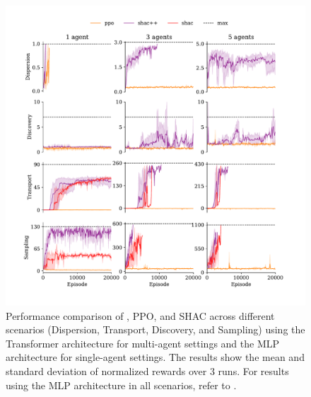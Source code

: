 \begin{figure}[!t]
    \includegraphics[width=\textwidth]{figs/main-transformer.pdf}
    \caption{Performance comparison of \fname{}, PPO, and SHAC across different scenarios (Dispersion, Transport, Discovery, and Sampling) using the Transformer architecture for multi-agent settings and the MLP architecture for single-agent settings. The results show the mean and standard deviation of normalized rewards over 3 runs. For results using the MLP architecture in all scenarios, refer to .}
    \label{fig:experiments}
\end{figure}

